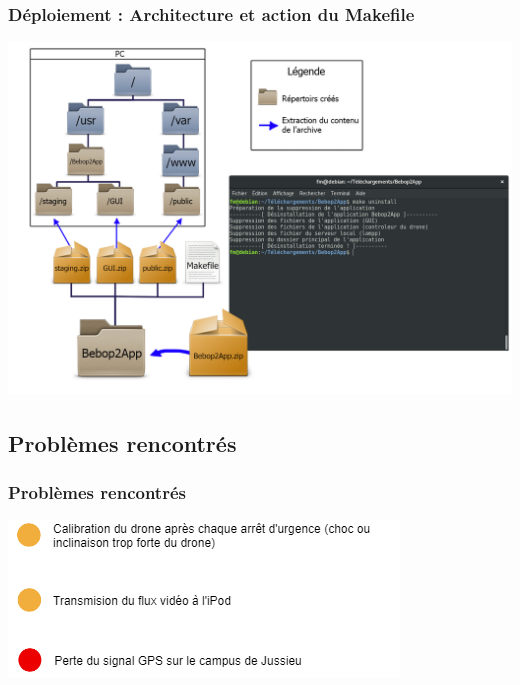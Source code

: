 \documentclass{beamer}
\begin{document}
    \begin{frame}
		\begin{center}
		\frametitle{Déploiement : Architecture et action du Makefile}
        \includegraphics[scale=0.24]{schema_deploiement_04.png}
		\end{center}
	\end{frame}



	
	\begin{frame}
	\section{Problèmes rencontrés}
		\begin{center}
		\frametitle{Problèmes rencontrés}
        \includegraphics[scale=0.75]{problemes.png}
		\end{center}
	\end{frame}
\end{document}
